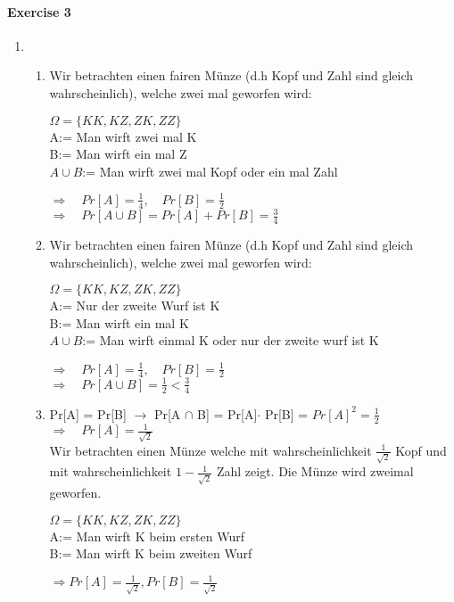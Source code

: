 \documentclass{report}
\begin{document}
\paragraph{Exercise 3}
\begin{enumerate}[label = \alph*)]
\item
\begin{enumerate}[label = \arabic*.]
\item Wir betrachten einen fairen Münze (d.h Kopf und Zahl sind gleich wahrscheinlich), welche zwei mal geworfen wird:
\begin{center}
$\Omega = \{KK,KZ,ZK,ZZ\}$\\
A:= Man wirft zwei mal K\\
B:= Man wirft ein mal Z\\
$A \cup B$:= Man wirft zwei mal Kopf oder ein mal Zahl
\end{center}
$\Rightarrow \quad Pr[A] =\frac{1}{4}, \quad Pr[B] = \frac{1}{2}$\\
$\Rightarrow \quad Pr[A \cup B] = Pr[A] + Pr[B] = \frac{3}{4}$
\item  Wir betrachten einen fairen Münze (d.h Kopf und Zahl sind gleich wahrscheinlich), welche zwei mal geworfen wird:
\begin{center}
$\Omega = \{KK,KZ,ZK,ZZ\}$\\
A:= Nur der zweite Wurf ist K\\
B:= Man wirft ein mal K\\
$A \cup B$:= Man wirft einmal K oder nur der zweite wurf ist K\\
\end{center}
$\Rightarrow \quad Pr[A] =\frac{1}{4}, \quad Pr[B] = \frac{1}{2}$\\
$\Rightarrow \quad Pr[A \cup B] = \frac{1}{2} <\frac {3}{4}$
\item Pr[A] = Pr[B] $\rightarrow$ Pr[A $\cap$ B] = Pr[A]$\cdot$ Pr[B] = $Pr[A]^2 = \frac{1}{2}$\\
$\Rightarrow \quad Pr[A] = \frac{1}{\sqrt{2}}$\\
Wir betrachten einen Münze welche mit wahrscheinlichkeit $\frac{1}{\sqrt{2}}$ Kopf und mit wahrscheinlichkeit $1-\frac{1}{\sqrt{2}}$ Zahl zeigt. Die Münze wird zweimal geworfen.
\begin{center}
$\Omega = \{KK,KZ,ZK,ZZ\}$\\
A:= Man wirft K beim ersten Wurf\\
B:= Man wirft K beim zweiten Wurf\\
\end{center}
$\Rightarrow Pr[A] = \frac{1}{\sqrt{2}}, Pr[B] = \frac{1}{\sqrt{2}}$\\

\end{enumerate}
\end{enumerate}
\end{document}
